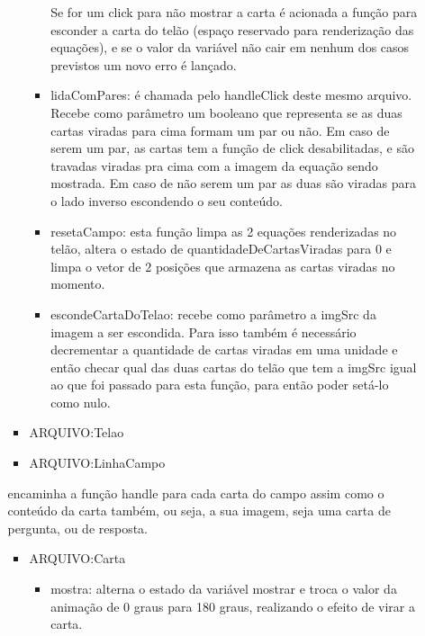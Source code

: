\begin{itemize}
\begin{itemize}
\begin{itemize}
\begin{itemize}
Se for um click para não mostrar a carta é acionada a função para esconder a carta do telão (espaço reservado para renderização das equações), e se o valor da variável não cair em nenhum dos casos previstos um novo erro é lançado.

	\item lidaComPares: é chamada pelo handleClick deste mesmo arquivo. Recebe como parâmetro um booleano que representa se as duas cartas viradas para cima formam um par ou não. Em caso de serem um par, as cartas tem a função de click desabilitadas, e são travadas viradas pra cima com a imagem da equação sendo mostrada. Em caso de não serem um par as duas são viradas para o lado inverso escondendo o seu conteúdo. 

	\item resetaCampo: esta função limpa as 2 equações renderizadas no telão, altera o estado de quantidadeDeCartasViradas para 0 e limpa o vetor de 2 posições que armazena as cartas viradas no momento.

	\item escondeCartaDoTelao: recebe como parâmetro a imgSrc da imagem a ser escondida. Para isso também é necessário decrementar a quantidade de cartas viradas em uma unidade e então checar qual das duas cartas do telão que tem a imgSrc igual ao que foi passado para esta função, para então poder setá-lo como nulo. 

	\end{itemize}
\end{itemize}

\begin{itemize}
\item ARQUIVO:Telao
\end{itemize}	


\begin{itemize}
\item ARQUIVO:LinhaCampo
\end{itemize}

	encaminha a função handle para cada carta do campo assim como o conteúdo da carta também, ou seja, a sua imagem, seja uma carta de pergunta, ou de resposta.
 
\begin{itemize}
\item ARQUIVO:Carta
	\begin{itemize}
	\item mostra: alterna o estado da variável mostrar e troca o valor da animação de 0 graus para 180 graus, realizando o efeito de virar a carta.


\end{itemize}
\end{itemize}
\end{itemize}
\end{itemize}
